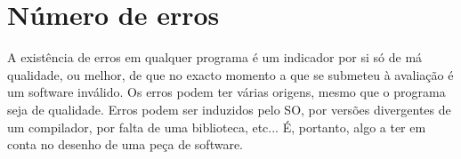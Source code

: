 \documentclass[a4paper,10pt,openright,openbib,twocolumn]{article}
\begin{document}
\section{Número de erros}
A existência de erros em qualquer programa é um indicador por si só de má qualidade, ou melhor, de que no exacto momento a que se submeteu à avaliação é um software inválido. Os erros podem ter várias origens, mesmo que o programa seja de qualidade. Erros podem ser induzidos pelo SO, por versões divergentes de um compilador, por falta de uma biblioteca, etc...
É, portanto, algo a ter em conta no desenho de uma peça de software. 
\end{document}
